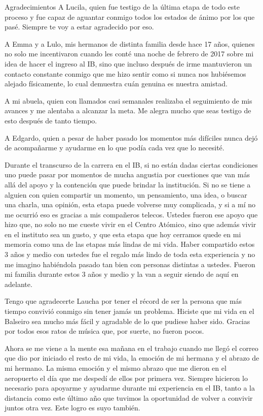 \documentclass[screen,pagebackref]{ibtesis}
\begin{document}
\begin{postliminary}
\begin{seccion}{Agradecimientos}
        A Lucila, quien fue testigo de la última etapa de todo este proceso y fue capaz de aguantar conmigo todos los estados de ánimo por los que pasé. Siempre te voy a estar agradecido por eso.

        A Emma y a Lulo, mis hermanos de distinta familia desde hace 17 años, quienes no solo me incentivaron cuando les conté una noche de febrero de 2017 sobre mi idea de hacer el ingreso al IB, sino que incluso después de irme mantuvieron un contacto constante conmigo que me hizo sentir como si nunca nos hubiésemos alejado físicamente, lo cual demuestra cuán genuina es nuestra amistad.

        A mi abuela, quien con llamados casi semanales realizaba el seguimiento de mis avances y me alentaba a alcanzar la meta. Me alegra mucho que seas testigo de esto después de tanto tiempo.

        A Edgardo, quien a pesar de haber pasado los momentos más difíciles nunca dejó de acompañarme y ayudarme en lo que podía cada vez que lo necesité.

        Durante el transcurso de la carrera en el IB, si no están dadas ciertas condiciones uno puede pasar por momentos de mucha angustia por cuestiones que van más allá del apoyo y la contención que puede brindar la institución. Si no se tiene a alguien con quien compartir un momento, un pensamiento, una idea, o buscar una charla, una opinión, esta etapa puede volverse muy complicada, y si a mí no me ocurrió eso es gracias a mis compañeros telecos. Ustedes fueron ese apoyo que hizo que, no solo no me cueste vivir en el Centro Atómico, sino que además vivir en el instituto sea un gusto, y que esta etapa que hoy cerramos quede en mi memoria como una de las etapas más lindas de mi vida. Haber compartido estos 3 años y medio con ustedes fue el regalo más lindo de toda esta experiencia y no me imagino habiéndola pasado tan bien con personas distintas a ustedes. Fueron mi familia durante estos 3 años y medio y la van a seguir siendo de aquí en adelante.

        Tengo que agradecerte Laucha por tener el récord de ser la persona que más tiempo convivió conmigo sin tener jamás un problema. Hiciste que mi vida en el Balseiro sea mucho más fácil y agradable de lo que pudiese haber sido. Gracias por todos esos ratos de música que, por suerte, no fueron pocos.

        Ahora se me viene a la mente esa mañana en el trabajo cuando me llegó el correo que dio por iniciado el resto de mi vida, la emoción de mi hermana y el abrazo de mi hermano. La misma emoción y el mismo abrazo que me dieron en el aeropuerto el día que me despedí de ellos por primera vez. Siempre hicieron lo necesario para apoyarme y ayudarme durante mi experiencia en el IB, tanto a la distancia como este último año que tuvimos la oportunidad de volver a convivir juntos otra vez. Este logro es suyo también.


\end{seccion}
\end{postliminary}
\end{document}
